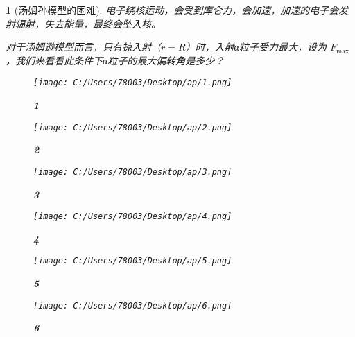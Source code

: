 \documentclass[UTF8]{report}
\theoremstyle{MyLineTheoremStyle} %
\theoremstyle{MyBlockTheoremStyle} %
\theoremstyle{MySubsubsectionStyle} %
\newtheorem{definition}{}
\begin{document}
\begin{definition}[汤姆孙模型的困难]
    电子绕核运动，会受到库仑力，会加速，加速的电子会发射辐射，失去能量，最终会坠入核。\par
    对于汤姆逊模型而言，只有掠入射（\(r=R\)）时，入射α粒子受力最大，设为 \(F_{\text{max}}\)，我们来看看此条件下α粒子的最大偏转角是多少？\par
    \begin{figure}[ht]
        \centering
        \texttt{[image: C:/Users/78003/Desktop/ap/1.png]}
        \caption{\textbf{1}}
        \label{fig:1}
    \end{figure}
    \begin{figure}[ht]
        \centering
        \texttt{[image: C:/Users/78003/Desktop/ap/2.png]}
        \caption{\textbf{2}}
        \label{fig:2}
    \end{figure}
    \begin{figure}[ht]
        \centering
        \texttt{[image: C:/Users/78003/Desktop/ap/3.png]}
        \caption{\textbf{3}}
        \label{fig:3}
    \end{figure}
    \begin{figure}[ht]
        \centering
        \texttt{[image: C:/Users/78003/Desktop/ap/4.png]}
        \caption{\textbf{4}}
        \label{fig:4}
    \end{figure}
    \begin{figure}[ht]
        \centering
        \texttt{[image: C:/Users/78003/Desktop/ap/5.png]}
        \caption{\textbf{5}}
        \label{fig:5}
    \end{figure}
    \begin{figure}[ht]
        \centering
        \texttt{[image: C:/Users/78003/Desktop/ap/6.png]}
        \caption{\textbf{6}}
        \label{fig:6}
    \end{figure}


\end{definition}
\end{document}
